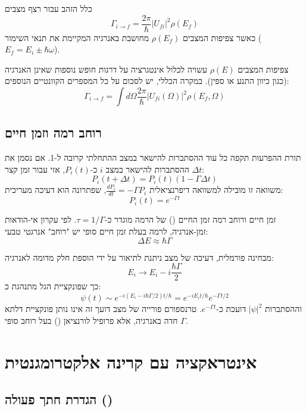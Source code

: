 \begin{resultbox}{כלל הזהב עבור רצף מצבים}
\[
\Gamma_{i \to f} = \frac{2\pi}{\hbar} |U_{fi}|^2 \rho(E_f)
\]
כאשר צפיפות המצבים $\rho(E_f)$ מחושבת באנרגיה המקיימת את תנאי השימור ($E_f = E_i \pm \hbar\omega$).
\end{resultbox}

\begin{notebox}
צפיפות המצבים $\rho(E)$ עשויה לכלול אינטגרציה על דרגות חופש נוספות שאינן האנרגיה (כגון כיוון התנע או ספין). במקרה הכללי, יש לסכום על כל המספרים הקוונטיים הנוספים:
\[
\Gamma_{i \to f} = \int d\Omega \frac{2\pi}{\hbar} |U_{fi}(\Omega)|^2 \rho(E_f, \Omega)
\]
\end{notebox}

\subsection{רוחב רמה וזמן חיים}

תורת ההפרעות תקפה כל עוד ההסתברות להישאר במצב ההתחלתי קרובה ל-1.
אם נסמן את ההסתברות להישאר במצב $i$ כ-$P_i(t)$, אזי עבור זמן קצר $\Delta t$:
\[
P_i(t + \Delta t) = P_i(t) (1 - \Gamma \Delta t)
\]
משוואה זו מובילה למשוואה דיפרנציאלית $\frac{dP_i}{dt} = -\Gamma P_i$, שפתרונה הוא דעיכה מעריכית:
\[
P_i(t) = e^{-\Gamma t}
\]
\begin{definitionbox}{זמן חיים ורוחב רמה}
זמן החיים () של הרמה מוגדר כ-$\tau = 1/\Gamma$.
לפי עקרון אי-הודאות זמן-אנרגיה, לרמה בעלת זמן חיים סופי יש "רוחב" אנרגטי טבעי:
\[
\Delta E \approx \hbar \Gamma
\]
\end{definitionbox}

מבחינה פורמלית, דעיכה של מצב ניתנת לתיאור על ידי הוספת חלק מדומה לאנרגיה:
\[
E_i \to E_i - i\frac{\hbar\Gamma}{2}
\]
כך שפונקציית הגל מתנהגת כ:
\[
\psi(t) \sim e^{-i(E_i - i\hbar\Gamma/2)t/\hbar} = e^{-iE_i t/\hbar} e^{-\Gamma t/2}
\]
וההסתברות $|\psi|^2$ דועכת כ-$e^{-\Gamma t}$. טרנספורם פורייה של מצב דועך זה אינו נותן פונקציית דלתא חדה באנרגיה, אלא פרופיל לורנציאן () בעל רוחב סופי $\Gamma$.

\section{אינטראקציה עם קרינה אלקטרומגנטית}

\subsection{הגדרת חתך פעולה ()}

